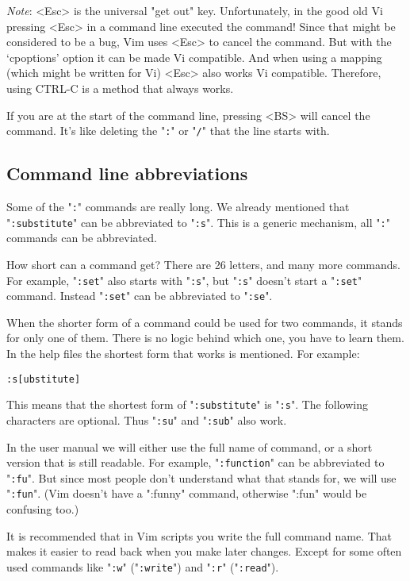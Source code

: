 \emph{Note}:
<Esc> is the universal "get out" key.
Unfortunately, in the good old Vi pressing <Esc> in a command line executed the command!
Since that might be considered to be a bug, Vim uses <Esc> to cancel the command.
But with the `cpoptions' option it can be made Vi compatible.
And when using a mapping (which might be written for Vi) <Esc> also works Vi compatible.
Therefore, using CTRL-C is a method that always works.

If you are at the start of the command line, pressing <BS> will cancel the command.
It's like deleting the "\verb!:!" or "\verb!/!" that the line starts with.
\subsection{Command line abbreviations}
Some of the "\verb!:!" commands are really long.
We already mentioned that "\verb!:substitute!" can be abbreviated to "\verb!:s!".
This is a generic mechanism, all "\verb!:!" commands can be abbreviated.

How short can a command get?  There are 26 letters, and many more commands.
For example, "\verb!:set!" also starts with "\verb!:s!", but "\verb!:s!" doesn't start a "\verb!:set!" command.
Instead "\verb!:set!" can be abbreviated to "\verb!:se!".

When the shorter form of a command could be used for two commands, it stands for only one of them.
There is no logic behind which one, you have to learn them.
In the help files the shortest form that works is mentioned.
For example:

\begin{Verbatim}[samepage=true]
 :s[ubstitute]
\end{Verbatim}

This means that the shortest form of "\verb!:substitute!" is "\verb!:s!".
The following characters are optional.
Thus "\verb!:su!" and "\verb!:sub!" also work.

In the user manual we will either use the full name of command, or a short version that is still readable.
For example, "\verb!:function!" can be abbreviated to "\verb!:fu!".
But since most people don't understand what that stands for, we will use "\verb!:fun!".
(Vim doesn't have a ":funny" command, otherwise ":fun" would be confusing too.)

It is recommended that in Vim scripts you write the full command name.
That makes it easier to read back when you make later changes.
Except for some often used commands like "\verb!:w!" ("\verb!:write!") and "\verb!:r!" ("\verb!:read!").

